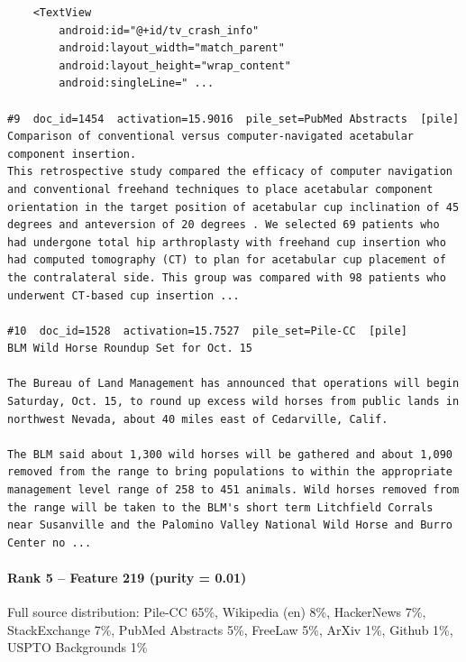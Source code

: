 \begin{verbatim}
    <TextView
        android:id="@+id/tv_crash_info"
        android:layout_width="match_parent"
        android:layout_height="wrap_content"
        android:singleLine=" ...

#9  doc_id=1454  activation=15.9016  pile_set=PubMed Abstracts  [pile]
Comparison of conventional versus computer-navigated acetabular component insertion.
This retrospective study compared the efficacy of computer navigation and conventional freehand techniques to place acetabular component orientation in the target position of acetabular cup inclination of 45 degrees and anteversion of 20 degrees . We selected 69 patients who had undergone total hip arthroplasty with freehand cup insertion who had computed tomography (CT) to plan for acetabular cup placement of the contralateral side. This group was compared with 98 patients who underwent CT-based cup insertion ...

#10  doc_id=1528  activation=15.7527  pile_set=Pile-CC  [pile]
BLM Wild Horse Roundup Set for Oct. 15

The Bureau of Land Management has announced that operations will begin Saturday, Oct. 15, to round up excess wild horses from public lands in northwest Nevada, about 40 miles east of Cedarville, Calif.

The BLM said about 1,300 wild horses will be gathered and about 1,090 removed from the range to bring populations to within the appropriate management level range of 258 to 451 animals. Wild horses removed from the range will be taken to the BLM's short term Litchfield Corrals near Susanville and the Palomino Valley National Wild Horse and Burro Center no ...

\end{verbatim}

\paragraph*{Rank 5 -- Feature 219 (purity = 0.01)}

Full source distribution: Pile-CC 65\%, Wikipedia (en) 8\%, HackerNews 7\%, StackExchange 7\%, PubMed Abstracts 5\%, FreeLaw 5\%, ArXiv 1\%, Github 1\%, USPTO Backgrounds 1\%

